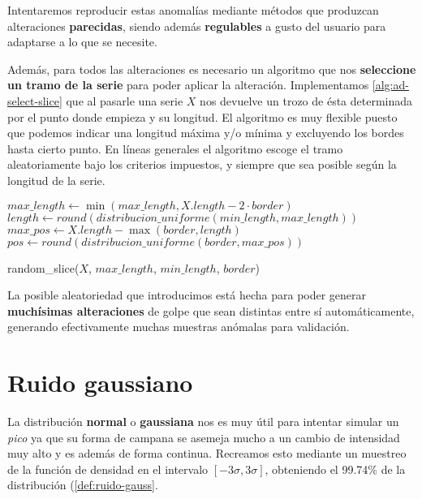 Intentaremos reproducir estas anomalías mediante métodos que produzcan alteraciones \textbf{parecidas}, siendo además \textbf{regulables} a gusto del usuario para adaptarse a lo que se necesite.

Además, para todos las alteraciones es necesario un algoritmo que nos \textbf{seleccione un tramo de la serie} para poder aplicar la alteración. Implementamos \autoref{alg:ad-select-slice} que al pasarle una serie $X$ nos devuelve un trozo de ésta determinada por el punto donde empieza y su longitud. El algoritmo es muy flexible puesto que podemos indicar una longitud máxima y/o mínima y excluyendo los bordes hasta cierto punto. En líneas generales el algoritmo escoge el tramo aleatoriamente bajo los criterios impuestos, y siempre que sea posible según la longitud de la serie.

\begin{algorithm}[htbp]
\SetAlgoLined
  $max\_length \gets \min(max\_length, X.length - 2 \cdot border)$\;
  $length \gets round(distribucion\_uniforme(min\_length, max\_length))$\;
  $max\_pos \gets X.length - \max(border, length)$\;
  $pos \gets round(distribucion\_uniforme(border, max\_pos))$\;
 \caption{random\_slice($X$, $max\_length$, $min\_length$, $border$)}
 \label{alg:ad-select-slice}
\end{algorithm}

La posible aleatoriedad que introducimos está hecha para poder generar \textbf{muchísimas alteraciones} de golpe que sean distintas entre sí automáticamente, generando efectivamente muchas muestras anómalas para validación.

\section{Ruido gaussiano}

La distribución \textbf{normal} o \textbf{gaussiana} nos es muy útil para intentar simular un \emph{pico} ya que su forma de campana se asemeja mucho a un cambio de intensidad muy alto y es además de forma continua. Recreamos esto mediante un muestreo de la función de densidad en el intervalo $[-3 \sigma, 3 \sigma]$, obteniendo el 99.74\% de la distribución (\autoref{def:ruido-gauss}.

